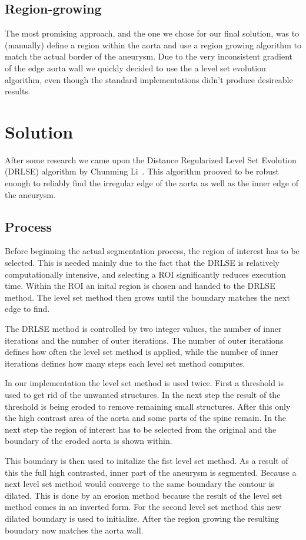 \documentclass[a4paper]{scrartcl}
\begin{document}
\subsection*{Region-growing}
The most promising approach, and the one we chose for our final solution, was
to (manually) define a region within the aorta and use a region growing
algorithm to match the actual border of the aneurysm. Due to the very
inconsistent gradient of the edge aorta wall we quickly decided to use the a
level set evolution algorithm, even though the standard implementations didn't
produce desireable results. 

\section*{Solution}
After some research we came upon the Distance Regularized Level Set Evolution
(DRLSE) algorithm by Chunming Li~\cite{Li_TIP08}. This algorithm prooved to be
robust enough to reliably find the irregular edge of the aorta as well as the
inner edge of the aneurysm.

\subsection*{Process}
Before beginning the actual segmentation process, the region of interest has to
be selected. This is needed mainly due to the fact that the DRLSE is relatively
computationally intensive, and selecting a ROI significantly reduces execution
time. Within the ROI an inital region is chosen and handed to the DRLSE method.
The level set method then grows until the boundary matches the next edge to 
find.

The DRLSE method is controlled by two integer values, the number of inner 
iterations and the number of outer iterations. The number of outer iterations 
defines how often the level set method is applied, while the number of inner 
iterations defines how many steps each level set method computes.

In our implementation the level set method is used twice. First a threshold is
used to get rid of the unwanted structures. In the next step the result of the
threshold is being eroded to remove remaining small structures. After this
only the high contrast area of the aorta and some parts of the spine remain.
In the next step the region of interest has to be selected from the original
and the boundary of the eroded aorta is shown within.

This boundary is then used to initalize the fist level set method. As a result
of this the full high contrasted, inner part of the aneurysm is segmented.
Because a next level set method would converge to the same boundary the contour
is dilated. This is done by an erosion method because the result of the level
set method comes in an inverted form. For the second level set method this new
dilated boundary is used to initialize. After the region growing the resulting
boundary now matches the aorta wall.
\end{document}

